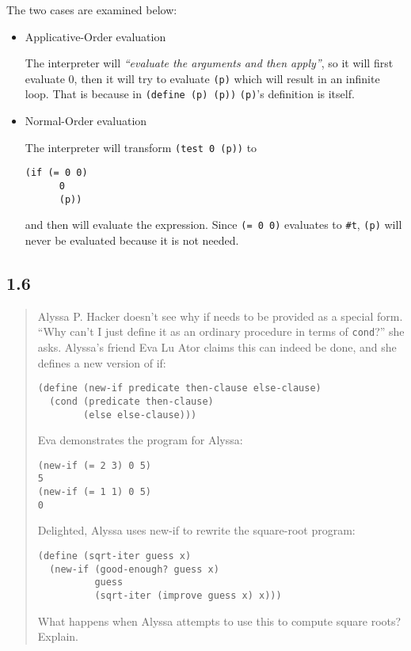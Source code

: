 \documentclass[a4paper, titlepage, twoside]{article}
\begin{document}
The two cases are examined below:

\begin{itemize}
\item Applicative-Order evaluation

The interpreter will \emph{``evaluate the arguments and then apply''}, so it will first evaluate 0, then it will try to evaluate \texttt{(p)} which will result in an infinite loop. That is because in \texttt{(define (p) (p))} \texttt{(p)}'s definition is itself.

\item Normal-Order evaluation

The interpreter will transform \texttt{(test 0 (p))} to

\begin{verbatim}
(if (= 0 0)
      0
      (p))
\end{verbatim}

and then will evaluate the expression. Since \texttt{(= 0 0)} evaluates to \texttt{#t}, \texttt{(p)} will never be evaluated because it is not needed.
\end{itemize}

\subsection*{1.6}
\label{sec:orgb19b172}

\begin{quote}
Alyssa P. Hacker doesn't see why if needs to be provided as a special form. “Why can't I just define it as an ordinary procedure in terms of \texttt{cond}?” she asks. Alyssa's friend Eva Lu Ator claims this can indeed be done, and she defines a new version of if:

\begin{verbatim}
(define (new-if predicate then-clause else-clause)
  (cond (predicate then-clause)
        (else else-clause)))
\end{verbatim}

Eva demonstrates the program for Alyssa:

\begin{verbatim}
(new-if (= 2 3) 0 5)
5
(new-if (= 1 1) 0 5)
0
\end{verbatim}

Delighted, Alyssa uses new-if to rewrite the square-root
program:

\begin{verbatim}
(define (sqrt-iter guess x)
  (new-if (good-enough? guess x)
          guess
          (sqrt-iter (improve guess x) x)))
\end{verbatim}

What happens when Alyssa attempts to use this to compute
square roots? Explain.
\end{quote}
\end{document}
